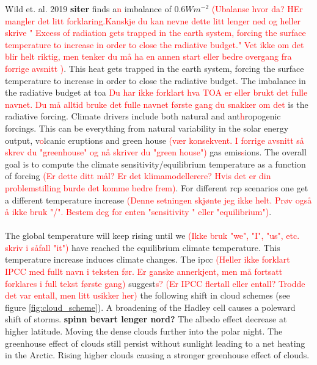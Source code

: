 Wild et. al. 2019  \textbf{siter} finds a\textcolor{red}{n} imbalance of $0.6W m^{-2}$ \textcolor{red}{(Ubalanse hvor da? HEr mangler det litt forklaring.Kanskje du kan nevne dette litt lenger ned og heller skrive " Excess of radiation gets trapped in the earth system, forcing the surface temperature to increase in order to close the radiative budget." Vet ikke om det blir helt riktig, men tenker du må ha en annen start eller bedre overgang fra forrige avsnitt )}. This heat gets trapped in the earth system, forcing the surface temperature to increase in order to close the radiative budget. The imbalance in the radiative budget at \acrshort{toa} \textcolor{red}{Du har ikke forklart hva TOA er eller brukt det fulle navnet. Du må alltid bruke det fulle navnet første gang du snakker om det} is the radiative forcing. Climate drivers include both natural and ant\textcolor{red}{h}ropogenic forcings. This can be everything from natural variability in the solar energy output, v\textcolor{red}{o}lcanic eruptions and green house \textcolor{red}{(vær konsekvent. I forrige avsnitt så skrev du "greenhouse" og nå skriver du "green house")} gas emis\textcolor{red}{s}ions. The overall goal is to compute the climate sensitivity/equilibrium temperature as a function of forcing \textcolor{red}{(Er dette ditt mål? Er det klimamodellerere? Hvis det er din problemstilling burde det komme bedre frem)}. For different \acrfull{rcp} scenarios one get a different temperature increase \textcolor{red}{(Denne setningen skjønte jeg ikke helt. Prøv også å ikke bruk "/". Bestem deg for enten "sensitivity " eller "equilibrium")}.
\\ \\ 
The global temperature will keep rising until we \textcolor{red}{(Ikke bruk "we", "I", "us", etc. skriv i såfall "it")} have reached the equilibrium climate temperature. This temperature increase induces climate changes. The \acrshort{ipcc} \textcolor{red}{(Heller ikke forklart IPCC med fullt navn i teksten før. Er ganske annerkjent, men må fortsatt forklares i full tekst første gang)} suggest\textcolor{red}{s? (Er IPCC flertall eller entall? Trodde det var entall, men litt usikker her)} the following shift in cloud schemes (see figure \ref{fig:cloud_scheme}). A broadening of the Hadley cell causes a poleward shift of storms. \textbf{spinn bevart lenger nord?} The albedo effect decrease at higher latitude. Moving the dense clouds further into the polar night. %
The greenhouse effect of clouds still persist without sunlight leading to a net heating in the Arctic. Rising higher clouds causing a stronger greenhouse effect of clouds.
